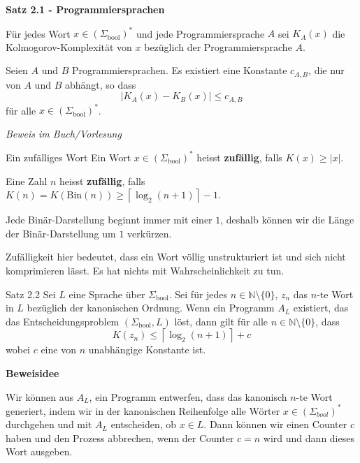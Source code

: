 \documentclass[a4paper, 11pt]{article}
\def\N{\mathbb{N}}
\begin{document}
    
    
        \textbf{Satz 2.1 - Programmiersprachen}

        Für jedes Wort $x \in (\Sigma_{\text{bool}})^*$ und jede Programmiersprache $A$ sei $K_A(x)$ die Kolmogorov-Komplexität von $x$ bezüglich der Programmiersprache $A$.
        \begin{mainbox}{}
            Seien $A$ und $B$ Programmiersprachen. Es existiert eine Konstante $c_{A,B}$, die nur von $A$ und $B$ abhängt, so dass 
            $$|K_A(x) -K_B(x)|\leq c_{A,B}$$
            für alle $x \in (\Sigma_{\text{bool}})^*$.
        \end{mainbox}
        \textit{Beweis im Buch/Vorlesung}
    
        \begin{mainbox}{Ein zufälliges Wort}
            Ein Wort $x \in (\Sigma_{\text{bool}})^*$ heisst \textbf{zufällig}, falls $K(x) \geq |x|$. 
            
            Eine Zahl $n$ heisst \textbf{zufällig}, falls $K(n) = K(\text{Bin}(n)) \geq \left\lceil\log_2(n + 1) \right\rceil - 1$.
        \end{mainbox}
        Jede Binär-Darstellung beginnt immer mit einer $1$, deshalb können wir die Länge der Binär-Darstellung um $1$ verkürzen.
    
        Zufälligkeit hier bedeutet, dass ein Wort völlig unstrukturiert ist und sich nicht komprimieren lässt. Es hat nichts mit Wahrscheinlichkeit zu tun.
    
        \begin{mainbox}{Satz 2.2}
            Sei $L$ eine Sprache über $\Sigma_{\text{bool}}$. Sei für jedes $n \in \N \setminus \{0\}$, $z_n$ das $n$-te Wort in $L$ bezüglich der kanonischen Ordnung. 
            Wenn ein Programm $A_L$ existiert, das das Entscheidungsproblem $(\Sigma_{\text{bool}}, L)$ löst, dann gilt für alle $n \in \N\setminus\{0\}$, dass
            $$K(z_n) \leq \left\lceil\log_2(n+1)\right\rceil + c$$
            wobei $c$ eine von $n$ unabhängige Konstante ist.
        \end{mainbox}
        \textbf{Beweisidee}

        Wir können aus $A_L$, ein Programm entwerfen, dass das kanonisch $n$-te Wort generiert, indem wir in der kanonischen Reihenfolge alle Wörter $x \in (\Sigma_{bool})^*$ durchgehen und mit $A_L$ entscheiden, ob $x \in L$. Dann können wir einen Counter $c$ haben und den Prozess abbrechen, wenn der Counter $c = n$ wird und dann dieses Wort ausgeben.
    
\end{document}
